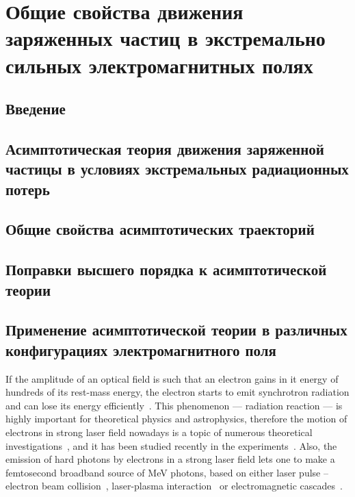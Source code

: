 \chapter{Общие свойства движения заряженных частиц в экстремально сильных электромагнитных полях}\label{ch:ch1}

\section{Введение}\label{sec:ch1/sec1}

\section{Асимптотическая теория движения заряженной частицы в условиях экстремальных радиационных потерь}\label{sec:ch1/sec2}
\section{Общие свойства асимптотических траекторий}\label{sec:ch1/sec3}
\section{Поправки высшего порядка к асимптотической теории}\label{sec:ch1/sec4}
\section{Применение асимптотической теории в различных конфигурациях электромагнитного поля}\label{sec:ch1/sec5}

If the amplitude of an optical field is such that an electron gains in it energy of hundreds of
its
rest-mass energy, the electron starts to emit synchrotron radiation and can lose its energy
efficiently~\cite{Bulanov04}. This phenomenon --- radiation reaction --- is highly important for theoretical physics
and astrophysics, therefore the motion of electrons in strong laser field nowadays is a topic of
numerous theoretical investigations~\cite{Di09, Duclous11, Nerush11b, Thomas12, Neitz13, Vranic16},
and it has been studied recently in the experiments~\cite{Cole17, Poder17}.  Also, the emission of
hard photons by electrons in a strong laser field lets one to make a femtosecond broadband source
of MeV photons, based on either laser pulse -- electron beam collision~\cite{Corde13, Sarri14,
Yan17}, laser-plasma interaction~\cite{Ridgers12, Bashinov13, Nerush14, JI14a, Li17} or
electromagnetic cascades~\cite{Nerush11a, Gonoskov17b}.

